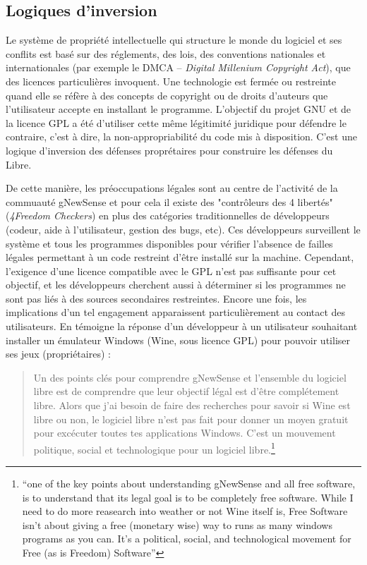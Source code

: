 \subsection{Logiques d'inversion}\label{3.1.3}

Le système de propriété intellectuelle qui structure le monde du logiciel et ses conflits est basé sur des réglements, des lois, des conventions nationales et internationales (par exemple le DMCA -- \emph{Digital Millenium Copyright Act}), que des licences particulières invoquent. Une technologie est fermée ou restreinte quand elle se réfère à des concepts de copyright ou de droits d'auteurs que l'utilisateur accepte en installant le programme. L'objectif du projet GNU et de la licence GPL a été d'utiliser cette même légitimité juridique pour défendre le contraire, c'est à dire, la non-appropriabilité du code mis à disposition. C'est une logique d'inversion des défenses proprétaires pour construire les défenses du Libre.

De cette manière, les préoccupations légales sont au centre de l'activité de la commuauté gNewSense et pour cela il existe des "contrôleurs des 4 libertés" (\emph{4Freedom Checkers}) en plus des catégories traditionnelles de développeurs (codeur, aide à l'utilisateur, gestion des bugs, etc). Ces développeurs surveillent le système et tous les programmes disponibles pour vérifier l'absence de failles légales permettant à un code restreint d'être installé sur la machine. Cependant, l'exigence d'une licence compatible avec le GPL n'est pas suffisante pour cet objectif, et les développeurs cherchent aussi à déterminer si les programmes ne sont pas liés à des sources secondaires restreintes. Encore une fois, les implications d'un tel engagement apparaissent particulièrement au contact des utilisateurs. En témoigne la réponse d'un développeur à un utilisateur souhaitant installer un émulateur Windows (Wine, sous licence GPL) pour pouvoir utiliser ses jeux (propriétaires) :

\begin{quote}
Un des points clés pour comprendre gNewSense et l'ensemble du logiciel libre est de comprendre que leur objectif légal est d'être complétement libre. Alors que j'ai besoin de faire des recherches pour savoir si Wine est libre ou non, le logiciel libre n'est pas fait pour donner un moyen gratuit pour excécuter toutes tes applications Windows. C'est un mouvement politique, social et technologique pour un logiciel libre.\footnote{“one of the key points about understanding gNewSense and all free software, is to understand that its legal goal is to be completely free software. While I need to do more reasearch into weather or not Wine itself is, Free Software isn't about  giving a free (monetary wise) way to runs as many windows programs as you can. It's a political, social, and technological movement for Free (as is Freedom) Software”}
\end{quote}

